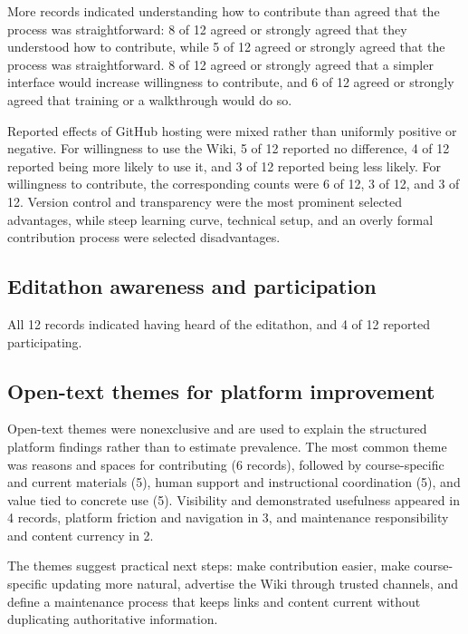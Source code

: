 \documentclass[11pt]{article}
\begin{document}
More records indicated understanding how to contribute than agreed that the process was straightforward: 8 of 12 agreed or strongly agreed that they understood how to contribute, while 5 of 12 agreed or strongly agreed that the process was straightforward. 8 of 12 agreed or strongly agreed that a simpler interface would increase willingness to contribute, and 6 of 12 agreed or strongly agreed that training or a walkthrough would do so.

Reported effects of GitHub hosting were mixed rather than uniformly positive or negative. For willingness to use the Wiki, 5 of 12 reported no difference, 4 of 12 reported being more likely to use it, and 3 of 12 reported being less likely. For willingness to contribute, the corresponding counts were 6 of 12, 3 of 12, and 3 of 12. Version control and transparency were the most prominent selected advantages, while steep learning curve, technical setup, and an overly formal contribution process were selected disadvantages.

\subsection{Editathon awareness and participation}
All 12 records indicated having heard of the editathon, and 4 of 12 reported participating.

\subsection{Open-text themes for platform improvement}
Open-text themes were nonexclusive and are used to explain the structured platform findings rather than to estimate prevalence. The most common theme was reasons and spaces for contributing (6 records), followed by course-specific and current materials (5), human support and instructional coordination (5), and value tied to concrete use (5). Visibility and demonstrated usefulness appeared in 4 records, platform friction and navigation in 3, and maintenance responsibility and content currency in 2.

The themes suggest practical next steps: make contribution easier, make course-specific updating more natural, advertise the Wiki through trusted channels, and define a maintenance process that keeps links and content current without duplicating authoritative information.
\end{document}
